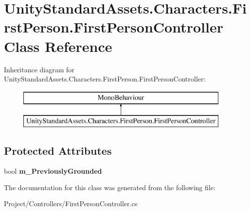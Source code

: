 \hypertarget{class_unity_standard_assets_1_1_characters_1_1_first_person_1_1_first_person_controller}{}\section{Unity\+Standard\+Assets.\+Characters.\+First\+Person.\+First\+Person\+Controller Class Reference}
\label{class_unity_standard_assets_1_1_characters_1_1_first_person_1_1_first_person_controller}
Inheritance diagram for Unity\+Standard\+Assets.\+Characters.\+First\+Person.\+First\+Person\+Controller\+:\begin{figure}[H]
\begin{center}
\leavevmode
\includegraphics[height=2.000000cm]{class_unity_standard_assets_1_1_characters_1_1_first_person_1_1_first_person_controller}
\end{center}
\end{figure}
\subsection*{Protected Attributes}
\begin{DoxyCompactItemize}
\item 
\mbox{\label{class_unity_standard_assets_1_1_characters_1_1_first_person_1_1_first_person_controller_aec0c34a848386bf93cea1eb2e7d199da}} 
bool {\bfseries m\+\_\+\+Previously\+Grounded}
\end{DoxyCompactItemize}


The documentation for this class was generated from the following file\+:\begin{DoxyCompactItemize}
\item 
Project/\+Controllers/First\+Person\+Controller.\+cs\end{DoxyCompactItemize}
